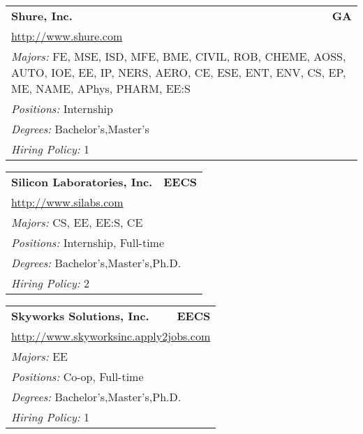 \documentclass[twoside]{article}
\begin{document}
\begin{center}
\begin{multicols}{3}
\begin{FlushLeft}
\begin{minipage}{.9\columnwidth}\begin{tabularx}{.95\columnwidth}{Xr}
                 {\Large\bf Shure, Inc.} & {\Large\bf GA}\\
    \multicolumn{2}{p{.95\columnwidth}}{\url{http://www.shure.com}}\\
    \multicolumn{2}{p{.95\columnwidth}}{\emph{Majors:} FE, MSE, ISD, MFE, BME, CIVIL, ROB, CHEME, AOSS, AUTO, IOE, EE, IP, NERS, AERO, CE, ESE, ENT, ENV, CS, EP, ME, NAME, APhys, PHARM, EE:S}\\
    \multicolumn{2}{p{.95\columnwidth}}{\emph{Positions:} Internship}\\
    \multicolumn{2}{p{.95\columnwidth}}{\emph{Degrees:} Bachelor's,Master's}\\
    \multicolumn{2}{p{.95\columnwidth}}{\emph{Hiring Policy:} 1}\\
    \end{tabularx}
    
\end{minipage}
 
\begin{minipage}{.9\columnwidth}\begin{tabularx}{.95\columnwidth}{Xr}
                 {\Large\bf Silicon Laboratories, Inc.} & {\Large\bf EECS}\\
    \multicolumn{2}{p{.95\columnwidth}}{\url{http://www.silabs.com}}\\
    \multicolumn{2}{p{.95\columnwidth}}{\emph{Majors:} CS, EE, EE:S, CE}\\
    \multicolumn{2}{p{.95\columnwidth}}{\emph{Positions:} Internship, Full-time}\\
    \multicolumn{2}{p{.95\columnwidth}}{\emph{Degrees:} Bachelor's,Master's,Ph.D.}\\
    \multicolumn{2}{p{.95\columnwidth}}{\emph{Hiring Policy:} 2}\\
    \end{tabularx}
    
\end{minipage}
 
\begin{minipage}{.9\columnwidth}\begin{tabularx}{.95\columnwidth}{Xr}
                 {\Large\bf Skyworks Solutions, Inc.} & {\Large\bf EECS}\\
    \multicolumn{2}{p{.95\columnwidth}}{\url{http://www.skyworksinc.apply2jobs.com}}\\
    \multicolumn{2}{p{.95\columnwidth}}{\emph{Majors:} EE}\\
    \multicolumn{2}{p{.95\columnwidth}}{\emph{Positions:} Co-op, Full-time}\\
    \multicolumn{2}{p{.95\columnwidth}}{\emph{Degrees:} Bachelor's,Master's,Ph.D.}\\
    \multicolumn{2}{p{.95\columnwidth}}{\emph{Hiring Policy:} 1}\\
    \end{tabularx}
    

\end{minipage}
\end{FlushLeft}
\end{multicols}
\end{center}
\end{document}
